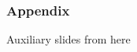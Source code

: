\begin{frame}
  \frametitle{Appendix}
  \begin{block}{Auxiliary slides from here}
  \end{block}
\end{frame}
    
